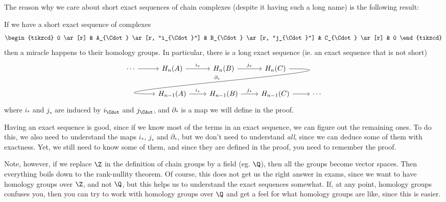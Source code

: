 \documentclass[a4paper]{article}
\begin{document}
The reason why we care about short exact sequences of chain complexes (despite it having such a long name) is the following result:
\begin{thm}
  If we have a short exact sequence of complexes
  \[
    \begin{tikzcd}
      0 \ar[r] & A_{\Cdot} \ar [r, "i_{\Cdot}"] & B_{\Cdot} \ar [r, "j_{\Cdot}"] & C_{\Cdot} \ar[r] & 0
    \end{tikzcd}
  \]
  then a miracle happens to their homology groups. In particular, there is a long exact sequence (ie. an exact sequence that is not short)
  \[
    \begin{tikzcd}
      \cdots \ar [r] & H_n(A) \ar[r, "i_*"] & H_n(B) \ar[r, "j_*"] & H_n(C) \ar[out=0, in=180, looseness=2, overlay, dll, "\partial_*"']\\
      & H_{n - 1}(A) \ar[r, "i_*"] & H_{n - 1}(B) \ar[r, "j_*"] & H_{n - 1}(C) \ar [r] & \cdots
    \end{tikzcd}
  \]
  where $i_*$ and $j_*$ are induced by $i_{\Cdot}$ and $j_{\Cdot}$, and $\partial_*$ is a map we will define in the proof.
\end{thm}
Having an exact sequence is good, since if we know most of the terms in an exact sequence, we can figure out the remaining ones. To do this, we also need to understand the maps $i_*$, $j_*$ and $\partial_*$, but we don't need to understand \emph{all}, since we can deduce some of them with exactness. Yet, we still need to know some of them, and since they are defined in the proof, you need to remember the proof.

Note, however, if we replace $\Z$ in the definition of chain groups by a field (eg. $\Q$), then all the groups become vector spaces. Then everything boils down to the rank-nullity theorem. Of course, this does not get us the right answer in exams, since we want to have homology groups over $\Z$, and not $\Q$, but this helps us to understand the exact sequences somewhat. If, at any point, homology groups confuses you, then you can try to work with homology groups over $\Q$ and get a feel for what homology groups are like, since this is easier.
\end{document}
